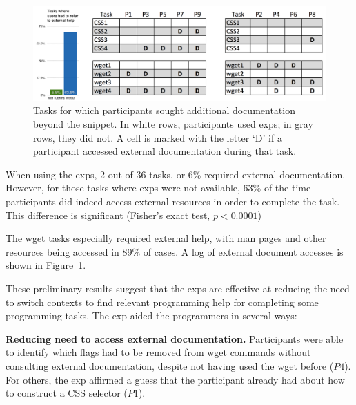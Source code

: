 \begin{figure}
\centering
\includegraphics[width=\columnwidth]{figures/doc_accesses_with_bars}
\caption{%
Tasks for which participants sought additional documentation beyond the snippet. In white rows, participants used \glspl{exp}; in gray rows, they did not.
A cell is marked with the letter `D' if a participant accessed external documentation during that task.
}
\label{fig:doc_accesses}
\end{figure}

\begin{changes}
When using the \glspl{exp}, 2 out of 36 tasks, or 6\% required external documentation.
However, for those tasks where \glspl{exp} were not available, 63\% of the time participants did indeed access external resources in order to complete the task.
This difference is significant (Fisher's exact test, $p < 0.0001$)
\end{changes}
The wget tasks especially required external help, with man pages and other resources being accessed in 89\% of cases.  
A log of external document accesses is shown in Figure~\ref{fig:doc_accesses}. 





These preliminary results suggest that the \glspl{exp} are effective at reducing the need to switch contexts to find relevant programming help  for completing some programming tasks. 
The \gls{exp} aided the programmers in several ways:

{\bf Reducing need to access external documentation.}
Participants were  able to identify which flags had to be removed from wget commands without consulting external documentation, despite not having used the wget before ($P4$).
For others, the \gls{exp} affirmed a guess that the participant already had about how to construct a CSS selector ($P1$).

